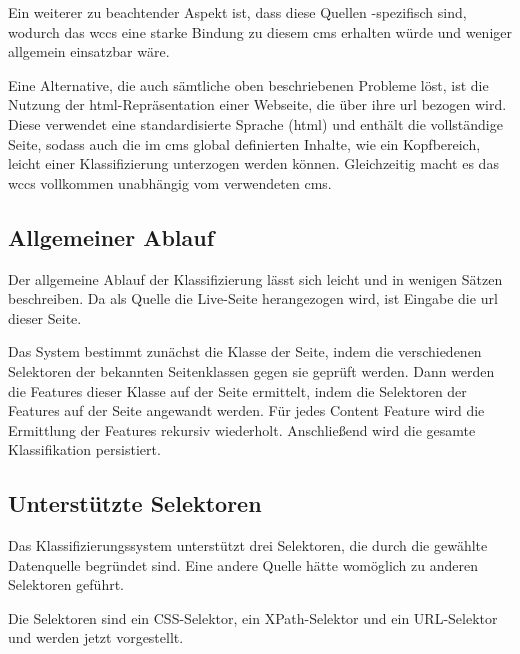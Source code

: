         Ein weiterer zu beachtender Aspekt ist, dass diese Quellen {\wordpress}-spezifisch sind,
        wodurch das \gls{wccs} eine starke Bindung zu diesem \gls{cms} erhalten würde
        und weniger allgemein einsatzbar wäre.

        Eine Alternative, die auch sämtliche oben beschriebenen Probleme löst,
        ist die Nutzung der \gls{html}-Repräsentation einer Webseite,
        die über ihre \gls{url} bezogen wird.
        Diese verwendet eine standardisierte Sprache (\gls{html}) und enthält
        die vollständige Seite, sodass auch die im \gls{cms} global definierten Inhalte,
        wie ein Kopfbereich, leicht einer Klassifizierung unterzogen werden können.
        Gleichzeitig macht es das \gls{wccs} vollkommen unabhängig vom verwendeten \gls{cms}.

    \subsection{Allgemeiner Ablauf}
        \label{section:solutionConceptClassificationAlg}
        Der allgemeine Ablauf der Klassifizierung lässt sich leicht und in wenigen Sätzen beschreiben.
        Da als Quelle die Live-Seite herangezogen wird, ist Eingabe die \gls{url} dieser Seite.

        Das System bestimmt zunächst die Klasse der Seite, indem die verschiedenen Selektoren der bekannten
        Seitenklassen gegen sie geprüft werden.
        Dann werden die Features dieser Klasse auf der Seite ermittelt,
        indem die Selektoren der Features auf der Seite angewandt werden.
        Für jedes Content Feature wird die Ermittlung der Features rekursiv wiederholt.
        Anschließend wird die gesamte Klassifikation persistiert.

    \subsection{Unterstützte Selektoren}
        \label{section:conceptSupportedSelectors}
        Das Klassifizierungssystem unterstützt drei Selektoren,
        die durch die gewählte Datenquelle begründet sind.
        Eine andere Quelle hätte womöglich zu anderen Selektoren geführt.

        Die Selektoren sind ein CSS-Selektor, ein XPath-Selektor und ein URL-Selektor
        und werden jetzt vorgestellt.


